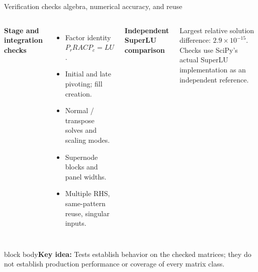 \documentclass[aspectratio=169,10pt]{beamer}
\newcommand{\takeaway}[1]{\vfill\begin{beamercolorbox}[sep=7pt,wd=\textwidth]{block body}\small\textbf{Key idea:} #1\end{beamercolorbox}}
\begin{document}
\begin{frame}{Verification checks algebra, numerical accuracy, and reuse}
\begin{columns}[T,onlytextwidth]
\textbf{Stage and integration checks}
\small\begin{itemize}\setlength\itemsep{6pt}
\item Factor identity $P_rRACP_c=LU$.
\item Initial and late pivoting; fill creation.
\item Normal / transpose solves and scaling modes.
\item Supernode blocks and panel widths.
\item Multiple RHS, same-pattern reuse, singular inputs.
\end{itemize}
\textbf{Independent SuperLU comparison}
\par\vspace{.2cm}
\small Largest relative solution difference: $2.9\times10^{-15}$. Checks use SciPy's actual SuperLU implementation as an independent reference.
\end{columns}
\takeaway{Tests establish behavior on the checked matrices; they do not establish production performance or coverage of every matrix class.}
\end{frame}
\end{document}
